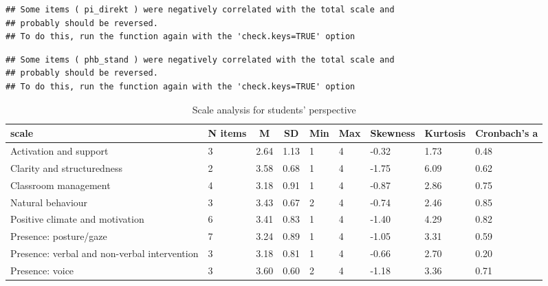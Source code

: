 \documentclass[
  english,
  man,floatsintext]{apa6}
\begin{document}
\begin{verbatim}
## Some items ( pi_direkt ) were negatively correlated with the total scale and 
## probably should be reversed.  
## To do this, run the function again with the 'check.keys=TRUE' option
\end{verbatim}

\begin{verbatim}
## Some items ( phb_stand ) were negatively correlated with the total scale and 
## probably should be reversed.  
## To do this, run the function again with the 'check.keys=TRUE' option
\end{verbatim}

\begin{table}[h]

\begin{center}
\begin{threeparttable}

\caption{\label{tab:table-all-scales-students}Scale analysis for students' perspective}

\tiny{

\begin{tabular}{lllllllll}
\toprule
scale & \multicolumn{1}{c}{N items} & \multicolumn{1}{c}{M} & \multicolumn{1}{c}{SD} & \multicolumn{1}{c}{Min} & \multicolumn{1}{c}{Max} & \multicolumn{1}{c}{Skewness} & \multicolumn{1}{c}{Kurtosis} & \multicolumn{1}{c}{Cronbach's a}\\
\midrule
Activation and support & 3 & 2.64 & 1.13 & 1 & 4 & -0.32 & 1.73 & 0.48\\
Clarity and structuredness & 2 & 3.58 & 0.68 & 1 & 4 & -1.75 & 6.09 & 0.62\\
Classroom management & 4 & 3.18 & 0.91 & 1 & 4 & -0.87 & 2.86 & 0.75\\
Natural behaviour & 3 & 3.43 & 0.67 & 2 & 4 & -0.74 & 2.46 & 0.85\\
Positive climate and motivation & 6 & 3.41 & 0.83 & 1 & 4 & -1.40 & 4.29 & 0.82\\
Presence: posture/gaze & 7 & 3.24 & 0.89 & 1 & 4 & -1.05 & 3.31 & 0.59\\
Presence: verbal and non-verbal intervention & 3 & 3.18 & 0.81 & 1 & 4 & -0.66 & 2.70 & 0.20\\
Presence: voice & 3 & 3.60 & 0.60 & 2 & 4 & -1.18 & 3.36 & 0.71\\
\bottomrule
\end{tabular}

}

\end{threeparttable}
\end{center}

\end{table}
\end{document}
